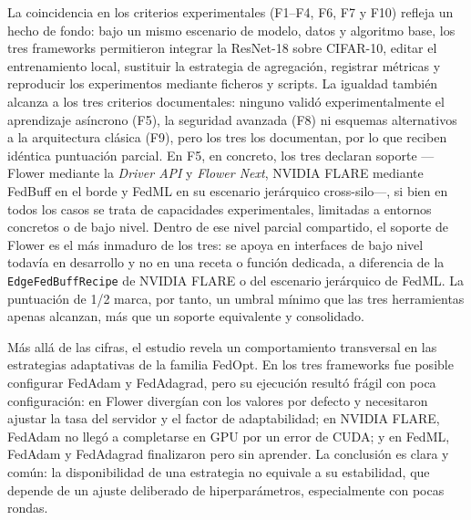 La coincidencia en los criterios experimentales (F1--F4, F6, F7 y F10) refleja un
hecho de fondo: bajo un mismo escenario de modelo, datos y algoritmo base, los tres
frameworks permitieron integrar la ResNet-18 sobre CIFAR-10, editar el entrenamiento
local, sustituir la estrategia de agregación, registrar métricas y reproducir los
experimentos mediante ficheros y scripts. La igualdad también alcanza a los tres
criterios documentales: ninguno validó experimentalmente el aprendizaje asíncrono (F5),
la seguridad avanzada (F8) ni esquemas alternativos a la arquitectura clásica (F9), pero
los tres los documentan, por lo que reciben idéntica puntuación parcial. En F5, en
concreto, los tres declaran soporte —Flower mediante la \textit{Driver API} y
\textit{Flower Next}, NVIDIA FLARE mediante FedBuff en el borde y FedML en su escenario
jerárquico cross-silo—, si bien en todos los casos se trata de capacidades
experimentales, limitadas a entornos concretos o de bajo nivel. Dentro de ese nivel
parcial compartido, el soporte de Flower es el más inmaduro de los tres: se apoya en
interfaces de bajo nivel todavía en desarrollo y no en una receta o función dedicada,
a diferencia de la \texttt{EdgeFedBuffRecipe} de NVIDIA FLARE o del escenario
jerárquico de FedML. La puntuación de 1/2 marca, por tanto, un umbral mínimo que las
tres herramientas apenas alcanzan, más que un soporte equivalente y consolidado.

Más allá de las cifras, el estudio revela un comportamiento transversal en las
estrategias adaptativas de la familia FedOpt. En los tres frameworks fue posible
configurar FedAdam y FedAdagrad, pero su ejecución resultó frágil con poca
configuración: en Flower divergían con los valores por defecto y necesitaron ajustar
la tasa del servidor y el factor de adaptabilidad; en NVIDIA FLARE, FedAdam no llegó a
completarse en GPU por un error de CUDA; y en FedML, FedAdam y FedAdagrad finalizaron
pero sin aprender. La conclusión es clara y común: la disponibilidad de una estrategia
no equivale a su estabilidad, que depende de un ajuste deliberado de hiperparámetros,
especialmente con pocas rondas.

